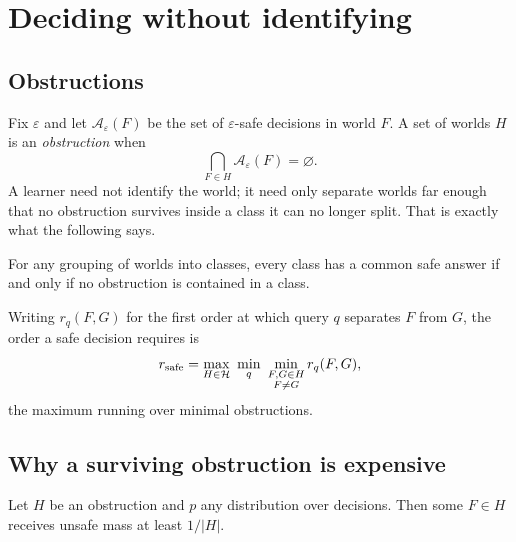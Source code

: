 \section{Deciding without identifying}
\label{sec:obstruction}

\subsection{Obstructions}

Fix $\varepsilon$ and let $\mathcal{A}_{\varepsilon}(F)$ be the set of $\varepsilon$-safe
decisions in world $F$. A set of worlds $H$ is an \emph{obstruction} when
\begin{equation}
\bigcap_{F\in H}\mathcal{A}_{\varepsilon}(F)=\varnothing .
\label{eq:obstruction}
\end{equation}
A learner need not identify the world; it need only separate worlds far enough that no
obstruction survives inside a class it can no longer split. That is exactly what the
following says.

\begin{theorem}
\label{thm:classes}
For any grouping of worlds into classes, every class has a common safe answer if and only
if no obstruction is contained in a class.
\end{theorem}


Writing $r_{q}(F,G)$ for the first order at which query $q$ separates $F$ from $G$, the
order a safe decision requires is
\begin{equation}
r_{\rm safe}=\max_{H\in\mathcal{H}}\ \min_{q}\ \min_{\substack{F,G\in H\\ F\ne G}}r_{q}(F,G),
\label{eq:rsafe}
\end{equation}
the maximum running over minimal obstructions.

\subsection{Why a surviving obstruction is expensive}

\begin{theorem}
\label{thm:floor}
Let $H$ be an obstruction and $p$ any distribution over decisions. Then some $F\in H$
receives unsafe mass at least $1/|H|$.
\end{theorem}

